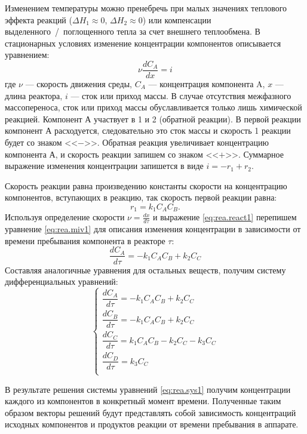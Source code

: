 Изменением температуры можно пренебречь при малых значениях теплового эффекта реакций ($\Delta H_1 \approx 0$, $\Delta H_2 \approx 0$) или компенсации выделенного~/~поглощенного тепла за счет внешнего теплообмена.
В стационарных условиях изменение концентрации компонентов описывается уравнением:
\begin{equation} \label{eq:rea.miv1}
\nu \dfrac{d C_A}{d x} = i
\end{equation}
где $\nu$ --- скорость движения среды, $C_A$ --- концентрация компонента A, $x$ --- длина реактора, $i$ --- сток или приход массы. В случае отсутствия межфазного массопереноса, сток или приход массы обуславливается только лишь химической реакцией. Компонент А участвует в 1 и 2 (обратной реакции). В первой реакции компонент А расходуется, следовательно это сток массы и скорость 1 реакции будет со знаком <<$-$>>. Обратная реакция увеличивает концентрацию компонента А, и скорость реакции запишем со знаком <<$+$>>. Суммарное выражение изменения концентрации запишется в виде $i=-r_1+r_2$.

Скорость реакции равна произведению константы скорости на концентрацию компонентов, вступающих в реакцию, так скорость первой реакции равна: 
\begin{equation} \label{eq:rea.react1}
r_1=k_1 C_A C_B.
\end{equation}
Используя определение скорости $\nu=\frac{d x}{d \tau}$ и выражение \eqref{eq:rea.react1}
перепишем уравнение \eqref{eq:rea.miv1} для описания изменения концентрации в зависимости от времени пребывания компонента в реакторе $\tau$:
\begin{equation}
\dfrac{d C_A}{d \tau} = -k_1 C_A C_B +k_2 C_C
\end{equation}
Составляя аналогичные уравнения для остальных веществ, получим систему дифференциальных уравнений:
\begin{equation}\label{eq:rea.sys1}
\left\lbrace 
\begin{gathered} 
\dfrac{d C_A} {d \tau} = -k_1 C_A C_B +k_2 C_C \\
\dfrac{d C_B} {d \tau} = -k_1 C_A C_B +k_2 C_C \\
\dfrac{d C_C} {d \tau} = k_1 C_A C_B -k_2 C_C - k_3 C_C \\
\dfrac{d C_D} {d \tau} = k_3 C_C \\
\end{gathered} 
\right.
\end{equation}

В результате решения системы уравнений \eqref{eq:rea.sys1} получим концентрации каждого из компонентов в конкретный момент времени. Полученные таким образом векторы решений будут представлять собой зависимость концентраций исходных компонентов и продуктов реакции от времени пребывания в аппарате.

